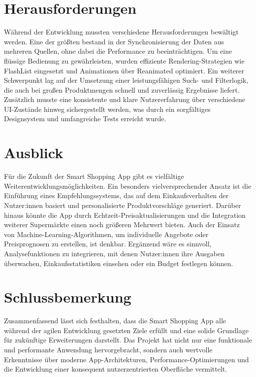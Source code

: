 \documentclass[12pt, a4paper]{report} %
\begin{document}
\section{Herausforderungen}
Während der Entwicklung mussten verschiedene Herausforderungen bewältigt werden. Eine der größten bestand in der Synchronisierung der Daten aus mehreren Quellen, ohne dabei die Performance zu beeinträchtigen. Um eine flüssige Bedienung zu gewährleisten, wurden effiziente Rendering-Strategien wie FlashList eingesetzt und Animationen über Reanimated optimiert.  
Ein weiterer Schwerpunkt lag auf der Umsetzung einer leistungsfähigen Such- und Filterlogik, die auch bei großen Produktmengen schnell und zuverlässig Ergebnisse liefert. Zusätzlich musste eine konsistente und klare Nutzererfahrung über verschiedene UI-Zustände hinweg sichergestellt werden, was durch ein sorgfältiges Designsystem und umfangreiche Tests erreicht wurde.

\section{Ausblick}
Für die Zukunft der Smart Shopping App gibt es vielfältige Weiterentwicklungsmöglichkeiten. Ein besonders vielversprechender Ansatz ist die Einführung eines Empfehlungssystems, das auf dem Einkaufsverhalten der Nutzer:innen basiert und personalisierte Produktvorschläge generiert.  
Darüber hinaus könnte die App durch Echtzeit-Preisaktualisierungen und die Integration weiterer Supermärkte einen noch größeren Mehrwert bieten. Auch der Einsatz von Machine-Learning-Algorithmen, um individuelle Angebote oder Preisprognosen zu erstellen, ist denkbar. Ergänzend wäre es sinnvoll, Analysefunktionen zu integrieren, mit denen Nutzer:innen ihre Ausgaben überwachen, Einkaufsstatistiken einsehen oder ein Budget festlegen können.

\section{Schlussbemerkung}
Zusammenfassend lässt sich festhalten, dass die Smart Shopping App alle während der agilen Entwicklung gesetzten Ziele erfüllt und eine solide Grundlage für zukünftige Erweiterungen darstellt. Das Projekt hat nicht nur eine funktionale und performante Anwendung hervorgebracht, sondern auch wertvolle Erkenntnisse über moderne App-Architekturen, Performance-Optimierungen und die Entwicklung einer konsequent nutzerzentrierten Oberfläche vermittelt.
\end{document}
